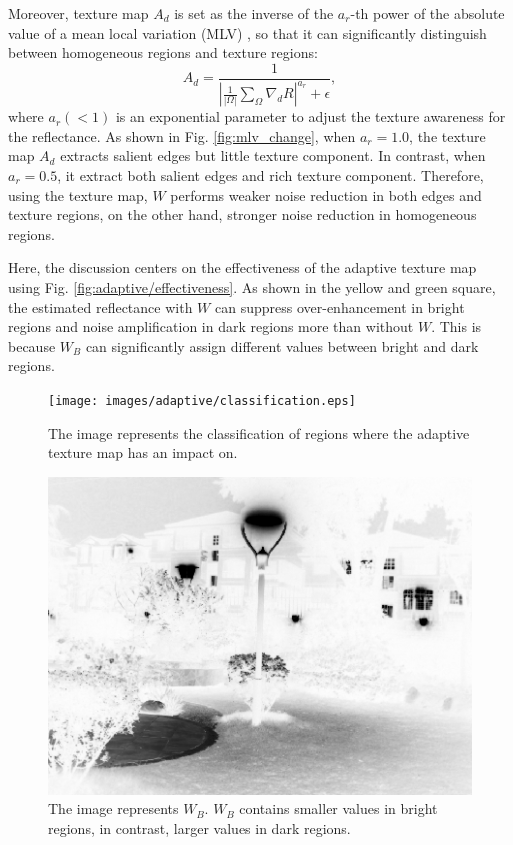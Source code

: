 Moreover, texture map $A_{d}$ is set as the inverse of the $a_{r}$-th power of the absolute value of a mean local variation (MLV) \cite{jiep}, so that it can significantly distinguish between homogeneous regions and texture regions:
\begin{equation}
A_{d} = \frac{1}{\left |\frac{1}{|\Omega|}\sum_{\Omega}\nabla_{d}{R} \right|^{a_{r}} + \epsilon}, \label{eq: mlv}
\end{equation}
where $a_{r} (< 1)$ is an exponential parameter to adjust the texture awareness for the reflectance.
As shown in Fig. \ref{fig:mlv_change}, when $a_{r}=1.0$, the texture map $A_{d}$ extracts salient edges but little texture component. In contrast, when $a_{r}=0.5$, it extract both salient edges and rich texture component. Therefore, using the texture map, $W$ performs weaker noise reduction in both edges and texture regions, on the other hand, stronger noise reduction in homogeneous regions.\par
Here, the discussion centers on the effectiveness of the adaptive texture map using Fig. \ref{fig:adaptive/effectiveness}.
As shown in the yellow and green square, the estimated reflectance with $W$ can suppress over-enhancement in bright regions and noise amplification in dark regions more than without $W$. This is because $W_{B}$ can significantly assign different values between bright and dark regions. 
\begin{figure}[tb]
	\centering
	\texttt{[image: images/adaptive/classification.eps]}
	\caption{The image represents the classification of regions where the adaptive texture map has an impact on.} \label{fig:adaptive/classification}
\end{figure}
\begin{figure}[tb]
	\centering
	\includegraphics[width=0.5\hsize]{images/adaptive/wb.eps}
	\caption{The image represents $W_{B}$. $W_{B}$ contains smaller values in bright regions, in contrast, larger values in dark regions.} \label{fig:adaptive/wb}
\end{figure}
